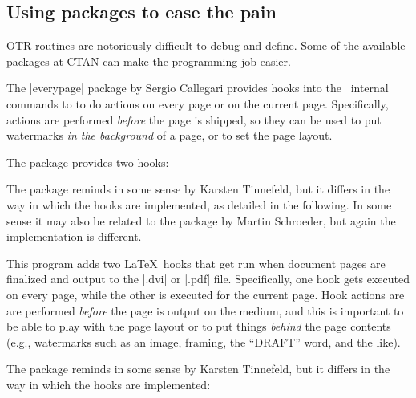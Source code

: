 \begin{teX}
 




\section{Using packages to ease the pain}

OTR routines are notoriously difficult to debug and define. Some of the available packages at CTAN
can make the programming job easier.

The |everypage| package by Sergio Callegari provides hooks into the \latex\ internal commands to
to do actions on every page or on the current page. Specifically, actions  are performed \emph{before} the page is shipped, so they can be
used to put watermarks \emph{in the background} of a page, or to
set the page layout. 

The package provides two hooks:

\begin{teXXX}
  \AddThisPageHook
\end{teXXX}

The package reminds in some sense
 by Karsten Tinnefeld, but it differs in the way in
 which the hooks are implemented, as detailed in the following.
 In some sense it may also be related to the package
  by Martin Schroeder, but again the implementation
 is different.

 
 This program adds two \LaTeX\ hooks that get run when document
 pages are finalized and output to the |.dvi| or |.pdf|
 file. Specifically, one hook gets executed on every page, while the
 other is executed for the current page. Hook actions are are performed
 \emph{before} the page is output on the medium, and this is
 important to be able to play with the page layout or to put things
 \emph{behind} the page contents (e.g., watermarks such as an image,
 framing, the ``DRAFT'' word, and the like).
 
 The package reminds in some sense  by Karsten
 Tinnefeld, but it differs in the way in which the hooks are
 implemented:
 



\end{teX}
